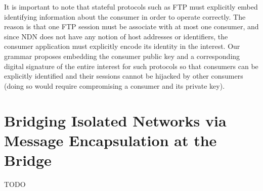 It is important to note that stateful protocols such as FTP must explicitly embed identifying information about the consumer in order to operate correctly. The reason is that one FTP session must be associate with at most one consumer, and since NDN does not have any notion of host addresses or identifiers, the consumer application must explicitly encode its identity in the interest. Our grammar proposes embedding the consumer public key and a corresponding digital signature of the entire interest for such protocols so that consumers can be explicitly identified and their sessions cannot be hijacked by other consumers (doing so would require compromising a consumer and its private key).

\section{Bridging Isolated Networks via Message Encapsulation at the Bridge}
TODO